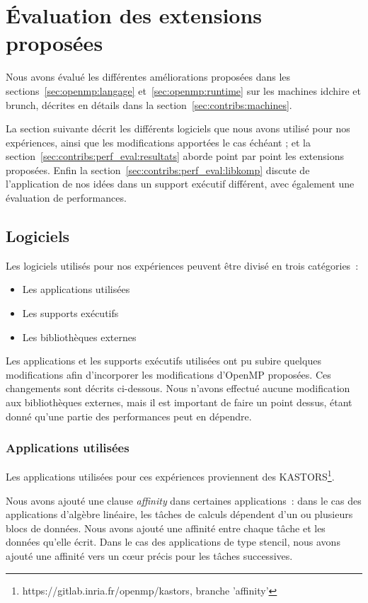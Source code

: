 \section{Évaluation des extensions proposées}\label{sec:contribs:perf_eval}


Nous avons évalué les différentes améliorations proposées dans les sections~\ref{sec:openmp:langage} et~\ref{sec:openmp:runtime} sur les machines idchire et brunch, décrites en détails dans la section~\ref{sec:contribs:machines}.

La section suivante décrit les différents logiciels que nous avons utilisé pour nos expériences, ainsi que les modifications apportées le cas échéant ; et la section~\ref{sec:contribs:perf_eval:resultats} aborde point par point les extensions proposées.
Enfin la section~\ref{sec:contribs:perf_eval:libkomp} discute de l'application de nos idées dans un support exécutif différent, avec également une évaluation de performances.


\subsection{Logiciels}

Les logiciels utilisés pour nos expériences peuvent être divisé en trois catégories~:
\begin{itemize}
  \item Les applications utilisées
  \item Les supports exécutifs
  \item Les bibliothèques externes
\end{itemize}

Les applications et les supports exécutifs utilisées ont pu subire quelques modifications afin d'incorporer les modifications d'OpenMP proposées.
Ces changements sont décrits ci-dessous.
Nous n'avons effectué aucune modification aux bibliothèques externes, mais il est important de faire un point dessus, étant donné qu'une partie des performances peut en dépendre.

\subsubsection{Applications utilisées}

Les applications utilisées pour ces expériences proviennent des KASTORS\footnote{https://gitlab.inria.fr/openmp/kastors, branche 'affinity'}.

Nous avons ajouté une clause \emph{affinity} dans certaines applications~: dans le cas des applications d'algèbre linéaire, les tâches de calculs dépendent d'un ou plusieurs blocs de données. Nous avons ajouté une affinité entre chaque tâche et les données qu'elle écrit.
Dans le cas des applications de type stencil, nous avons ajouté une affinité vers un cœur précis pour les tâches successives.


